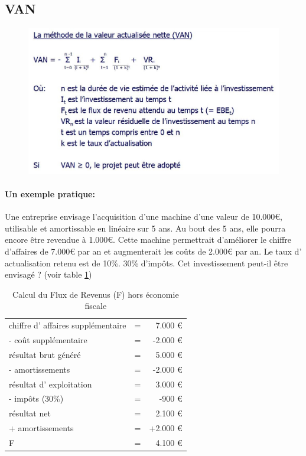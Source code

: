 \documentclass{article}
\begin{document}
\subsection{VAN}
\begin{figure}[H]
	\centering
	\includegraphics[width=14cm]{van.jpg}
\end{figure}

\paragraph{Un exemple pratique:}
Une entreprise envisage l’acquisition d’une machine d’une valeur de 10.000\euro{}, utilisable et amortissable en linéaire sur 5 ans.
Au bout des 5 ans, elle pourra encore être revendue à 1.000\euro{}.
Cette machine permettrait d’améliorer le chiffre d’affaires de 7.000\euro{} par an et augmenterait les coûts de 2.000\euro{} par an. Le taux d’ actualisation retenu est de
10\%. 30\% d’impôts. Cet investissement peut-il être envisagé ? (voir table \ref{van})

\begin{table}[H]
\begin{tabular}{l c r}
	chiffre d’ affaires supplémentaire &=&	7.000 \euro{}\\
	- coût supplémentaire	&=&	-2.000 \euro{} \\
	\hline
	résultat brut généré	&=&	5.000 	\euro{}\\
	- amortissements	&=&	-2.000 	\euro{}\\
	\hline
	résultat d’	exploitation	&=&	3.000 \euro{}\\
	- impôts (30\%)	&=&	-900 	\euro{}\\
	\hline
	\color{red}résultat net	&\color{red}=&	\color{red}2.100 	\euro{}\\
	+ amortissements	&=&	+2.000 	\euro{}\\
	\hline
	\color{red}F	&\color{red}=&	\color{red}4.100 	\euro{}\\
\end{tabular}
\caption{\label{van} Calcul du Flux de Revenus (F) hors économie fiscale}
\end{table}
\end{document}
